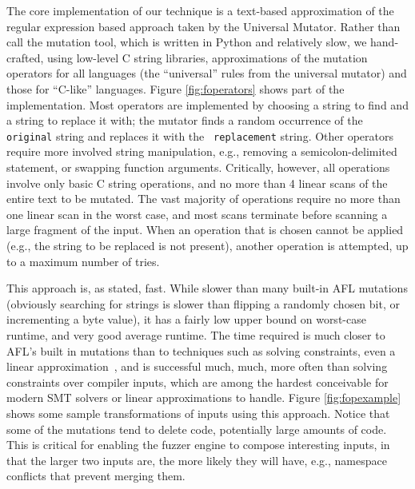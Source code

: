 \begin{sloppypar}
The core implementation of our technique is a text-based approximation
of the regular expression based approach taken by the Universal
Mutator.  Rather than call the mutation tool, which is written in
Python and relatively slow, we hand-crafted, using low-level C string
libraries, approximations of the mutation operators for all languages
(the ``universal'' rules from the universal mutator) and those for
``C-like'' languages.  Figure \ref{fig:foperators} shows part of the
implementation.  Most operators are implemented by choosing a string
to find and a string to replace it with; the mutator finds a random
occurrence of the {\tt original} string and replaces it with the {\tt
  replacement} string.  Other operators require more involved string
manipulation, e.g., removing a semicolon-delimited statement, or
swapping function arguments.  Critically, however, all operations
involve only basic C string operations, and no more than 4 linear
scans of the entire text to be mutated.  The vast majority of operations require no
more than one linear scan in the worst case, and most scans terminate
before scanning a large fragment of the input.  When an operation that
is chosen cannot be applied (e.g., the string to be replaced is not
present), another operation is attempted, up to a maximum number of
tries.

\end{sloppypar}

This approach is, as stated, fast.  While slower than many built-in
AFL mutations (obviously searching for strings is slower than flipping
a randomly chosen bit, or incrementing a byte value), it has a fairly
low upper bound on worst-case runtime, and very good average runtime.  The time required is much
closer to AFL's built in mutations than to techniques such as
solving constraints, even a linear
approximation~\cite{Eclipser}, and is successful much, much, more
often than solving constraints over compiler inputs, which are among
the hardest conceivable for modern SMT solvers or linear
approximations to handle.  Figure \ref{fig:fopexample} shows some
sample transformations of inputs using this approach.  Notice that
some of the mutations tend to delete code, potentially large amounts
of code.  This is critical for enabling the fuzzer engine to compose
interesting inputs, in that the larger two inputs are, the
more likely they will have, e.g., namespace conflicts that prevent
merging them.

